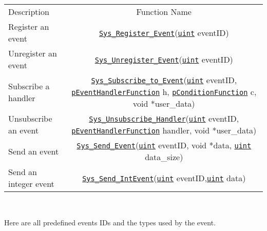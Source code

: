\documentclass[a4paper,9pt]{extarticle}
\newcommand{\uintt}{\href{http://openswarm.org/os-doc/d6/dc2/definitions\_8h.html\#a1445ebbbf93d62972255ec5e89a5ab01}{\texttt{uint}}\xspace}
\newcommand{\pEventHandlerFunction}{\href{http://openswarm.org/os-doc/db/dd2/events\_8h.html\#a3db5730a7fed6827a4c46ff3fae3e55b}{\texttt{pEventHandlerFunction}}\xspace}
\newcommand{\pConditionFunction}{\href{http://openswarm.org/os-doc/db/dd2/events\_8h.html\#a653a4a4b7d9f5a65e1415365267a9d9e}{\texttt{pConditionFunction}}\xspace}
\begin{document}
 
\begin{center} 
\begin{tabular}{lc}
    \rowcolor{blue!50}
    Description				&	Function Name\\
    Register an event & \href{http://openswarm.org/os-doc/de/deb/events_8c.html#a5d9657772509ddb7ac6f6e1aa5730308}{\texttt{Sys\_Register\_Event}}(\uintt eventID) \\
    Unregister an event  	& 	\href{http://openswarm.org/os-doc/db/dd2/events_8h.html#a41c81e9472691694352ac8316dc0ddbf}{\texttt{Sys\_Unregister\_Event}}(\uintt eventID) \\
    Subscribe a handler  	& 	\href{http://openswarm.org/os-doc/db/dd2/events_8h.html#a41c81e9472691694352ac8316dc0ddbf}{\texttt{Sys\_Subscribe\_to\_Event}}(\uintt eventID, \pEventHandlerFunction h, \pConditionFunction c, void *user\_data) \\
    Unsubscribe an event 	& 	\href{http://openswarm.org/os-doc/db/dd2/events_8h.html#a41c81e9472691694352ac8316dc0ddbf}{\texttt{Sys\_Unsubscribe\_Handler}}(\uintt eventID, \pEventHandlerFunction handler, void *user\_data) \\
    Send an event 	& 	\href{http://openswarm.org/os-doc/de/deb/events_8c.html#a67230a5307e77a8112e56436f372926f}{\texttt{Sys\_Send\_Event}}(\uintt eventID,  void *data, \uintt data\_size) \\
    Send an integer event 	& 	\href{http://openswarm.org/os-doc/de/deb/events_8c.html#a67230a5307e77a8112e56436f372926f}{\texttt{Sys\_Send\_IntEvent}}(\uintt eventID,\uintt data)
\end{tabular}\\
\end{center}

Here are all predefined events IDs and the types used by the event. \\
\end{document}
